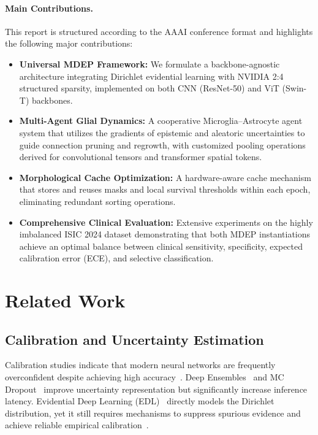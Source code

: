\documentclass[letterpaper]{article} %
\begin{document}
\paragraph{Main Contributions.} This report is structured according to the AAAI conference format and highlights the following major contributions:
\begin{itemize}
    \item \textbf{Universal MDEP Framework:} We formulate a backbone-agnostic architecture integrating Dirichlet evidential learning with NVIDIA 2:4 structured sparsity, implemented on both CNN (ResNet-50) and ViT (Swin-T) backbones.
    \item \textbf{Multi-Agent Glial Dynamics:} A cooperative Microglia--Astrocyte agent system that utilizes the gradients of epistemic and aleatoric uncertainties to guide connection pruning and regrowth, with customized pooling operations derived for convolutional tensors and transformer spatial tokens.
    \item \textbf{Morphological Cache Optimization:} A hardware-aware cache mechanism that stores and reuses masks and local survival thresholds within each epoch, eliminating redundant sorting operations.
    \item \textbf{Comprehensive Clinical Evaluation:} Extensive experiments on the highly imbalanced ISIC 2024 dataset demonstrating that both MDEP instantiations achieve an optimal balance between clinical sensitivity, specificity, expected calibration error (ECE), and selective classification.
\end{itemize}

\section{Related Work}\label{sec:related}

\subsection{Calibration and Uncertainty Estimation}
Calibration studies indicate that modern neural networks are frequently overconfident despite achieving high accuracy~\cite{guo2017calibration, minderer2021revisiting}. Deep Ensembles~\cite{lakshminarayanan2017simple} and MC Dropout~\cite{gal2016dropout} improve uncertainty representation but significantly increase inference latency. Evidential Deep Learning (EDL)~\cite{sensoy2018evidential} directly models the Dirichlet distribution, yet it still requires mechanisms to suppress spurious evidence and achieve reliable empirical calibration~\cite{shen2024mirage}.
\end{document}
